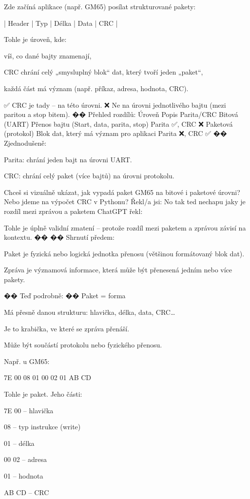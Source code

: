 Zde začíná aplikace (např. GM65) posílat strukturované pakety:

| Header | Typ | Délka | Data | CRC |

Tohle je úroveň, kde:

    víš, co dané bajty znamenají,

    CRC chrání celý „smysluplný blok“ dat, který tvoří jeden „paket“,

    každá část má význam (např. příkaz, adresa, hodnota, CRC).

✅ CRC je tady – na této úrovni.
❌ Ne na úrovni jednotlivého bajtu (mezi paritou a stop bitem).
�� Přehled rozdílů:
Úroveň	Popis	Parita/CRC
Bitová (UART)	Přenos bajtu (Start, data, parita, stop)	Parita ✅, CRC ❌
Paketová (protokol)	Blok dat, který má význam pro aplikaci	Parita ❌, CRC ✅
�� Zjednodušeně:

    Parita: chrání jeden bajt na úrovni UART.

    CRC: chrání celý paket (více bajtů) na úrovni protokolu.

Chceš si vizuálně ukázat, jak vypadá paket GM65 na bitové i paketové úrovni? Nebo jdeme na výpočet CRC v Pythonu?
Řekl/a jsi:
No tak ted nechapu jaky je rozdíl mezi zprávou a paketem
ChatGPT řekl:

Tohle je úplně validní zmatení – protože rozdíl mezi paketem a zprávou závisí na kontextu. ��
�� Shrnutí předem:

    Paket je fyzická nebo logická jednotka přenosu (většinou formátovaný blok dat).

    Zpráva je významová informace, která může být přenesená jedním nebo více pakety.

�� Teď podrobně:
�� Paket = forma

    Má přesně danou strukturu: hlavička, délka, data, CRC…

    Je to krabička, ve které se zpráva přenáší.

    Může být součástí protokolu nebo fyzického přenosu.

Např. u GM65:

7E 00 08 01 00 02 01 AB CD

Tohle je paket. Jeho části:

    7E 00 – hlavička

    08 – typ instrukce (write)

    01 – délka

    00 02 – adresa

    01 – hodnota

    AB CD – CRC

